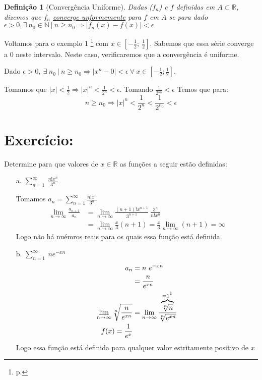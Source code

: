\documentclass[12pt,openany]{book}
\newtheorem{definition}{Definição}[section]
\newcommand{\LI}[1][n]{\lim_{{#1} \rightarrow \infty}}
\newcommand{\soma}[2][n]{\sum_{{#1} = #2}^\infty}
\begin{document}
\begin{definition}[Convergência Uniforme]
Dadas ($f_n$) e $f$ definidas em $A \subset \mathds{R}$, dizemos que $f_n$ \underline{converge unformemente} para $f$ em $A$ se para dado $\epsilon > 0, \exists \ n_0 \in \mathds{N} \ | \ n \geq n_0 \Rightarrow |f_n(x) - f(x)| < \epsilon$
\end{definition}

Voltamos para o exemplo 1 \footnote{p. \pageref{ex:302a}} com $x \in [-\frac{1}{2}; \ \frac{1}{2}]$. Sabemos que essa série converge a 0 neste intervalo. Neste caso, verificaremos que a convergência é uniforme.

Dado $\epsilon > 0, \ \exists \ n_0 \ | \ n \geq n_0 \Rightarrow |x^n-0| < \epsilon \ \forall \ x \in [-\frac{1}{2};\frac{1}{2}]$.

Tomamos que $\displaystyle{|x| < \frac{1}{2} \Rightarrow |x|^n < \frac{1}{2^n} <\epsilon}$. Tomando $\displaystyle{\frac{1}{2^{n_0}} < \epsilon}$ Temos  que para: $$n \geq n_0 \Rightarrow |x|^n < \frac{1}{2^n} < \frac{1}{2^{n_0}} < \epsilon$$

\section*{Exercício:} Determine para que valores de $x \in \mathds{R}$ as funções a seguir estão definidas:
\begin{itemize}
\item [a.] $\displaystyle{\soma{1} \ \frac{n! x^n}{3^n}}$

Tomamos $a_n = \soma{1} \frac{n! x^n}{3^n}$ 
\begin{align*}
\LI \frac{a_{n+1}}{a_n} &= \LI \frac{(n+1)! x^{n+1}}{3^{n+1}}\ \frac{3^n}{n! x^n} \\
&= \LI \frac{x}{3} (n+1) = \frac{x}{3} \LI (n+1) = \infty
\end{align*}
Logo não há nuémros reais para os quais essa função está definida.
\item [b.] $\displaystyle{\soma{1} \ ne^{-xn}}$
\begin{align*}
a_n &= n \ e^{-xn} \\
&= \frac{n}{e^{xn}} \\
\LI \sqrt[n]{\frac{n}{e^{xn}}} &= \LI \frac{\overbrace{\sqrt[n]{n}}^{=1 \footnote{\ref{subsec:ex223}}}}{\sqrt[n]{e^{xn}}} \\
f(x) = \frac{1}{e^x}
\end{align*}
Logo essa função está definida para qualquer valor estritamente positivo de $x$
\end{itemize}
\end{document}
